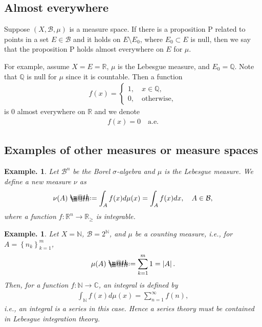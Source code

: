 \documentclass[openany, a4paper, oneside]{book}
\makeatletter
\newcommand*{\defeq}{\mathrel{\rlap{%
\raisebox{0.3ex}{$\m@th\cdot$}}%
\raisebox{-0.3ex}{$\m@th\cdot$}}%
=}
\theoremstyle{break}
\theoremstyle{breakdefn}
\newtheorem{ex}[thm]{Example.}
\newcommand{\abs}[1]{\left|#1\right|}
\newcommand{\cbk}[1]{\left\{#1\right\}}
\newcommand{\bbC}{\mathbb{C}}
\newcommand{\bbN}{\mathbb{N}}
\newcommand{\bbQ}{\mathbb{Q}}
\newcommand{\bbR}{\mathbb{R}}
\newcommand{\bbRn}{\mathbb{R}^n}
\newcommand{\calB}{\mathcal{B}}
\makeatother
\begin{document}
\subsection{Almost everywhere}
\label{sec-7-1-2-5}

Suppose $(X, \calB, \mu)$ is a measure space.
If there is a proposition P related to points in a set $E \in \calB$
and it holds on $E \setminus E_0$, where $E_0 \subset E$ is null,
then we say that the proposition P holds almost everywhere on $E$ for $\mu$.

For example, assume $X = E = \bbR$, $\mu$ is the Lebesgue measure, and $E_0 = \bbQ$.
Note that $\bbQ$ is null for $\mu$ since it is countable.
Then a function
\begin{align}
 f (x)
 =
 \begin{cases}
 1, \quad x \in \bbQ, \\
 0, \quad \text{otherwise},
 \end{cases}
\end{align}
is $0$ almost everywhere on $\bbR$ and we denote
\begin{align}
 f (x) = 0 \quad \text{a.e.}
\end{align}
\subsection{Examples of other measures or measure spaces}
\label{sec-7-1-2-6}

\begin{ex}
 Let $\calB^n$ be the Borel $\sigma$-algebra and $\mu$ is the Lebesgue measure.
 We define a new measure $\nu$ as
 \begin{align}
  \nu (A)
  \defeq
  \int_A f (x) d \mu (x)
  =
  \int_A f (x) dx, \quad A \in \calB,
 \end{align}
 where a function $f \colon \bbRn \to \bbR_{\geq}$ is integrable.
\end{ex}
\begin{ex}
 Let $X = \bbN$, $\calB = 2^{\bbN}$, and $\mu$ be a counting measure, i.e., for $A = \cbk{n_k}_{k=1}^m$,
 \begin{align}
  \mu (A)
  \defeq
  \sum_{k=1}^m 1
  =
  \abs{A}.
 \end{align}
 Then, for a function $f \colon \bbN \to \bbC$, an integral is defined by
 \begin{align}
  \int_{\bbN} f (x) d \mu (x)
  =
  \sum_{n=1}^{\infty} f (n),
 \end{align}
 i.e., an integral is a series in this case.
 Hence a series theory must be contained in Lebesgue integration theory.
\end{ex}
\end{document}
